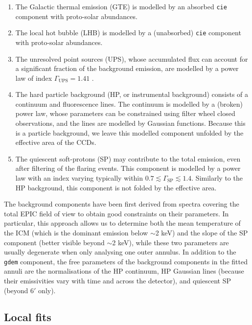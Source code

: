 \documentclass{aa}
\begin{document}
\begin{enumerate}
\item The Galactic thermal emission (GTE) is modelled by an absorbed \texttt{cie} component with proto-solar abundances.

\item The local hot bubble (LHB) is modelled by a (unabsorbed) \texttt{cie} component with proto-solar abundances.

\item The unresolved point sources (UPS), whose accumulated flux can account for a significant fraction of the background emission, are modelled by a power law of index $\Gamma_\text{UPS}=1.41$ \citep{2004A&A...419..837D}.

\item The hard particle background (HP, or instrumental background) consists of a continuum and fluorescence lines. The continuum is modelled by a (broken) power law, whose parameters can be constrained using filter wheel closed observations, and the lines are modelled by Gaussian functions. Because this is a particle background, we leave this modelled component unfolded by the effective area of the CCDs.

\item The quiescent soft-protons (SP) may contribute to the total emission, even after filtering of the flaring events. This component is modelled by a power law with an index varying typically within $0.7 \lesssim \Gamma_\text{SP} \lesssim 1.4$. Similarly to the HP background, this component is not folded by the effective area.
\end{enumerate}

The background components have been first derived from spectra covering the total EPIC field of view to obtain good constraints on their parameters. In particular, this approach allows us to determine both the mean temperature of the ICM (which is the dominant emission below $\sim$2 keV) and the slope of the SP component (better visible beyond $\sim$2 keV), while these two parameters are usually degenerate when only analysing one outer annulus. 
In addition to the \texttt{gdem} component, the free parameters of the background components in the fitted annuli are the normalisations of the HP continuum, HP Gaussian lines (because their emissivities vary with time and across the detector), and quiescent SP (beyond 6$'$ only).




\subsection{Local fits}\label{sect:local_fits}
\end{document}
